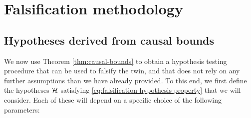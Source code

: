 

\section{Falsification methodology} \label{sec:hypotheses-from-causal-bounds}

\subsection{Hypotheses derived from causal bounds} \label{sec:hypotheses-from-causal-bounds-setup}


We now use Theorem \ref{thm:causal-bounds} to obtain a hypothesis testing procedure that can be used to falsify the twin, and that does not rely on any further assumptions than we have already provided.
To this end, we first define the hypotheses $\mathcal{H}$ satisfying \eqref{eq:falsification-hypothesis-property} that we will consider. %
Each of these will depend on a specific choice of the following parameters:

